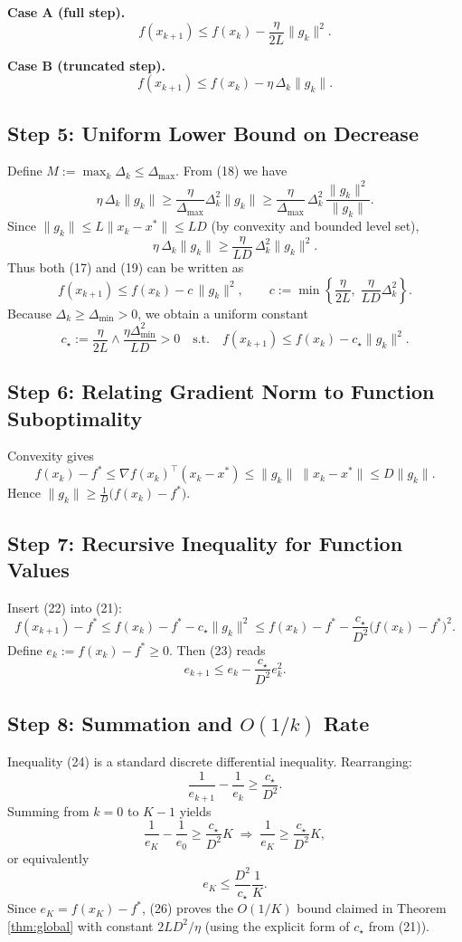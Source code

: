 \documentclass[11pt]{article}
\begin{document}
\noindent\textbf{Case A (full step).}
\[
f(x_{k+1})\le f(x_{k})-\frac{\eta}{2L}\|g_{k}\|^{2}.
\tag{17}
\]

\noindent\textbf{Case B (truncated step).}
\[
f(x_{k+1})\le f(x_{k})-\eta\,\Delta_{k}\|g_{k}\|.
\tag{18}
\]

\subsection*{Step 5: Uniform Lower Bound on Decrease}
Define $M:=\max_{k}\Delta_{k}\le\Delta_{\max}$.  
From (18) we have
\[
\eta\,\Delta_{k}\|g_{k}\|\ge\frac{\eta}{\Delta_{\max}}\Delta_{k}^{2}\|g_{k}\|
\ge\frac{\eta}{\Delta_{\max}}\,\Delta_{k}^{2}\,\frac{\|g_{k}\|^{2}}{\|g_{k}\|}.
\]
Since $\|g_{k}\|\le L\|x_{k}-x^{*}\|\le LD$ (by convexity and bounded level set),
\[
\eta\,\Delta_{k}\|g_{k}\|\ge
\frac{\eta}{LD}\,\Delta_{k}^{2}\|g_{k}\|^{2}.
\tag{19}
\]
Thus both (17) and (19) can be written as
\[
f(x_{k+1})\le f(x_{k})-c\,\|g_{k}\|^{2},
\qquad
c:=\min\!\left\{\frac{\eta}{2L},\;\frac{\eta}{LD}\Delta_{k}^{2}\right\}.
\tag{20}
\]
Because $\Delta_{k}\ge\Delta_{\min}>0$, we obtain a uniform constant
\[
c_{\star}:=\frac{\eta}{2L}\wedge\frac{\eta\Delta_{\min}^{2}}{LD}>0
\quad\text{s.t.}\quad
f(x_{k+1})\le f(x_{k})-c_{\star}\|g_{k}\|^{2}.
\tag{21}
\]

\subsection*{Step 6: Relating Gradient Norm to Function Suboptimality}
Convexity gives
\[
f(x_{k})-f^{*}\le \nabla f(x_{k})^{\!\top}(x_{k}-x^{*})
\le \|g_{k}\|\;\|x_{k}-x^{*}\|
\le D\|g_{k}\|.
\tag{22}
\]
Hence $\|g_{k}\|\ge\frac{1}{D}\bigl(f(x_{k})-f^{*}\bigr)$.

\subsection*{Step 7: Recursive Inequality for Function Values}
Insert (22) into (21):
\[
f(x_{k+1})-f^{*}\le f(x_{k})-f^{*}
-c_{\star}\|g_{k}\|^{2}
\le f(x_{k})-f^{*}
-\frac{c_{\star}}{D^{2}}\bigl(f(x_{k})-f^{*}\bigr)^{2}.
\tag{23}
\]
Define $e_{k}:=f(x_{k})-f^{*}\ge0$. Then (23) reads
\[
e_{k+1}\le e_{k}-\frac{c_{\star}}{D^{2}}e_{k}^{2}.
\tag{24}
\]

\subsection*{Step 8: Summation and $O(1/k)$ Rate}
Inequality (24) is a standard discrete differential inequality.
Rearranging:
\[
\frac{1}{e_{k+1}}-\frac{1}{e_{k}}
\ge \frac{c_{\star}}{D^{2}}.
\tag{25}
\]
Summing from $k=0$ to $K-1$ yields
\[
\frac{1}{e_{K}}-\frac{1}{e_{0}}
\ge \frac{c_{\star}}{D^{2}}K
\;\Longrightarrow\;
\frac{1}{e_{K}}\ge \frac{c_{\star}}{D^{2}}K,
\]
or equivalently
\[
e_{K}\le \frac{D^{2}}{c_{\star}}\frac{1}{K}.
\tag{26}
\]
Since $e_{K}=f(x_{K})-f^{*}$, (26) proves the $O(1/K)$ bound claimed in
Theorem \ref{thm:global} with constant $2LD^{2}/\eta$ (using the explicit
form of $c_{\star}$ from (21)).  
\end{document}

